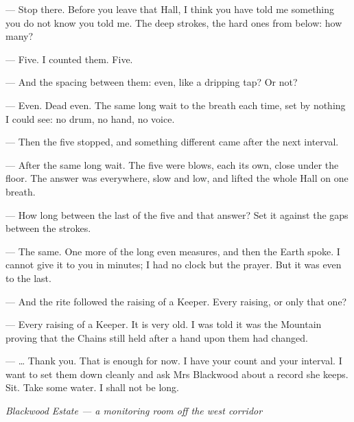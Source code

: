 \begin{room}

--- Stop there. Before you leave that Hall, I think you have told me something you do not know you told me. The deep strokes, the hard ones from below: how many?

--- Five. I counted them. Five.

--- And the spacing between them: even, like a dripping tap? Or not?

--- Even. Dead even. The same long wait to the breath each time, set by nothing I could see: no drum, no hand, no voice.

--- Then the five stopped, and something different came after the next interval.

--- After the same long wait. The five were blows, each its own, close under the floor. The answer was everywhere, slow and low, and lifted the whole Hall on one breath.

--- How long between the last of the five and that answer? Set it against the gaps between the strokes.

--- The same. One more of the long even measures, and then the Earth spoke. I cannot give it to you in minutes; I had no clock but the prayer. But it was even to the last.

--- And the rite followed the raising of a Keeper. Every raising, or only that one?

--- Every raising of a Keeper. It is very old. I was told it was the Mountain proving that the Chains still held after a hand upon them had changed.

--- \ldots{} Thank you. That is enough for now. I have your count and your interval. I want to set them down cleanly and ask Mrs Blackwood about a record she keeps. Sit. Take some water. I shall not be long.

\end{room}

\begin{center}\small\itshape Blackwood Estate --- a monitoring room off the west corridor\end{center}

